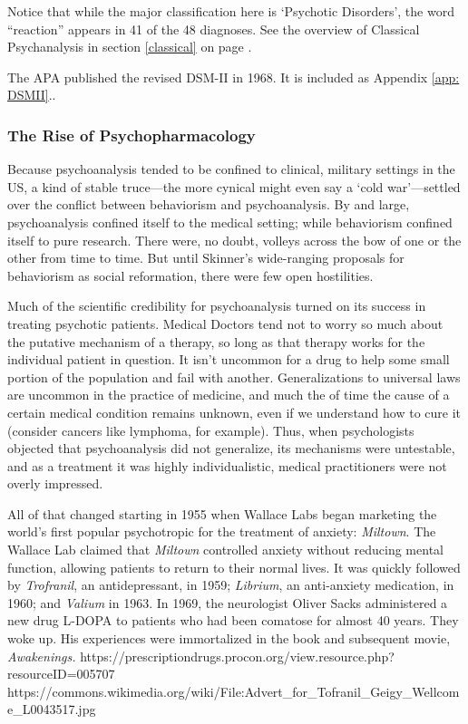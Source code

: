Notice that while the major classification here is `Psychotic Disorders', the word ``reaction'' appears in 41 of the 48 diagnoses. See the overview of Classical Psychanalysis in section \ref{classical} on page \pageref{classical}.

The APA published the revised DSM-II in 1968. It is included as Appendix \ref{app: DSMII}..

\subsubsection{The Rise of Psychopharmacology}
\label{theriseofpsychopharmacology}

Because psychoanalysis tended to be confined to clinical, military settings in the US, a kind of stable truce---the more cynical might even say a `cold war'---settled over the conflict between behaviorism and psychoanalysis. By and large, psychoanalysis confined itself to the medical setting; while behaviorism confined itself to pure research. There were, no doubt, volleys across the bow of one or the other from time to time. But until Skinner's wide-ranging proposals for behaviorism as social reformation, there were few open hostilities.

Much of the scientific credibility for psychoanalysis turned on its success in treating psychotic patients. Medical Doctors tend not to worry so much about the putative mechanism of a therapy, so long as that therapy works for the individual patient in question. It isn't uncommon for a drug to help some small portion of the population and fail with another. Generalizations to universal laws are uncommon in the practice of medicine, and much the of time the cause of a certain medical condition remains unknown, even if we understand how to cure it (consider cancers like lymphoma, for example). Thus, when psychologists objected that psychoanalysis did not generalize, its mechanisms were untestable, and as a treatment it was highly individualistic, medical practitioners were not overly impressed. 

All of that changed starting in 1955 when Wallace Labs began marketing the world's first popular psychotropic for the treatment of anxiety: \emph{Miltown}. The Wallace Lab claimed that \emph{Miltown} controlled anxiety without reducing mental function, allowing patients to return to their normal lives. It was quickly followed by \emph{Trofranil}, an antidepressant, in 1959; \emph{Librium}, an anti-anxiety medication, in 1960; and \emph{Valium} in 1963. In 1969, the neurologist Oliver Sacks administered a new drug L-DOPA to patients who had been comatose for almost 40 years. They woke up. His experiences were immortalized in the book and subsequent movie, \emph{Awakenings.}
https:\slash \slash prescriptiondrugs.procon.org\slash view.resource.php?resourceID=005707
https:\slash \slash commons.wikimedia.org\slash wiki\slash File:Advert\_for\_Tofranil\_Geigy\_Wellcome\_L0043517.jpg

